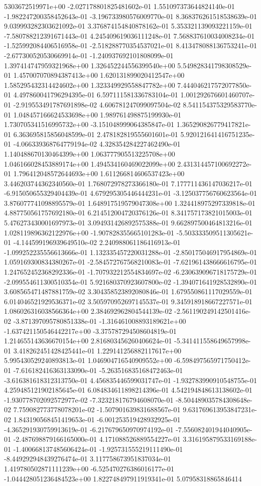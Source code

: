 5303672519971e+00	-2.027178801825481602e-01	1.551097373644824140e-01	-1.982247200358452643e-01	-3.196733980576009770e-01	8.368376261518538639e-01	9.039993282303621092e-01	3.376874154840878162e-01	5.353321139093221159e-01	-7.580788212391671443e-01	4.245409619036111248e-01	7.568837610034008234e-01	-1.525992084406516958e-01	-2.518288770354537021e-01	8.413478088136753241e-01	-2.677300520530669914e-01	-1.240937692101808099e-01	1.397414747959321968e+00	1.326452244556399540e+00	5.549828341798308529e-01	1.457007070894387413e+00	1.620131899020412547e+00	1.585295432314424602e+00	1.323349929558847782e+00	7.444046217572077850e-01	4.497860041796294395e-01	6.597111581336783104e-01	1.001292676601460707e-01	-2.919553491787691898e-02	4.606781247099097504e-02	8.541154375329583770e-01	1.048457166624533698e+00	1.989761498875199930e-01	1.730705341516995732e+00	-3.151048999064385847e-01	1.365290826779417821e-01	6.363695815856048599e-01	2.478182819555601601e-01	5.920121641416751235e-01	-4.066339368764779194e-02	4.328354284227462490e-01	1.140488670130464399e+00	1.063777905513225708e+00	1.046166028453889174e+00	1.494534160469022099e+00	2.431314457100692272e-01	1.796412048572644693e+00	1.611266814606537423e+00	3.446203744362340560e-01	1.768072978273366180e-01	7.177711436147036217e-01	-6.915050655329404439e-01	4.679295305446444231e-01	-3.125037756760623564e-01	3.876077741098895579e-01	1.648917519579047308e+00	1.324418975297339818e-01	4.887750561757692180e-01	6.214512004720376126e-01	8.341757173821015003e-01	5.476273430001697973e-01	3.094931426892575388e-01	9.662897500464813216e-01	1.028119896362122976e+00	-1.907828355665101283e-01	-5.503333509511305621e-01	-4.144599196939649510e-02	2.240988061186416913e-01	-1.099252235556613666e-01	1.132335457220031288e-01	-2.850175046917954869e-01	1.059169300834380267e-01	-2.584572767568210083e-01	-7.621961438666616795e-01	1.247652452368292336e-01	-1.707932212554834697e-02	-6.230639096718175729e-01	-2.099554611300510354e-01	5.921680370923607800e-02	-1.394071641928532890e-01	3.608565471487881759e-02	3.304358523892080846e-01	1.679550861117029559e-01	6.014046521929536371e-02	3.505970952697145537e-01	9.345918918667227571e-01	1.086026316038566364e+00	2.384692962804544139e-02	-2.561190249142501416e-02	-3.871397095780851338e-01	-1.316461008893189621e+00	-1.637421150546442217e+00	-3.375787294508604819e-01	1.214655143636670154e+00	2.816803456260406624e-01	-5.341411558649657998e-01	3.418262451428425441e-01	1.229141256882117617e+00	5.995430529240893813e-01	1.046904716540909552e+00	-6.598497565971750412e-01	-7.616182416363133090e-01	-5.263516835168472463e-01	-3.616381618312313750e-01	4.456835446599031747e-01	-1.932783990910548755e-01	4.259485121902185645e-01	6.084834611898214396e-01	4.542194848613138602e-01	-1.930778702092572977e-02	-7.323218176794608070e-01	-8.504489035784308648e-02	7.759082773778078201e-02	-1.507901639831688567e-01	9.631769613953847231e-02	1.843190568451419653e-01	-6.001253519428932925e-01	-4.365291930759913619e-01	-6.217679650970974192e-01	-7.556082401944040905e-01	-2.487698879166165000e-01	4.171088526889554227e-01	3.316195879533169188e-01	-1.400668137485606424e-01	-1.925731555219111490e-01	-8.449292948439276474e-01	3.117758673951837034e-01	1.419780502871111239e+00	-6.525470276386016177e-01	-1.044428051236484523e+00	1.822748497911919341e-01	5.07958318865846414